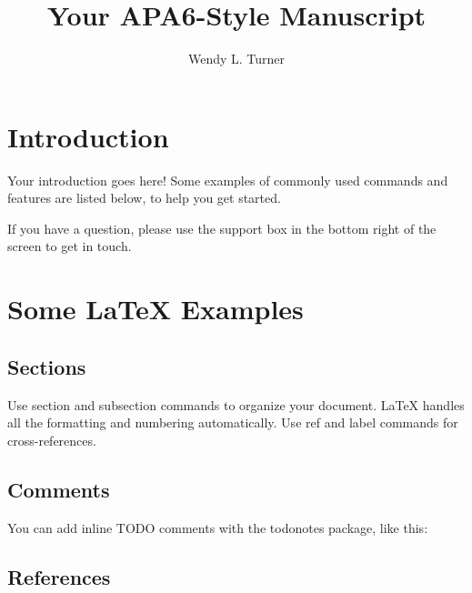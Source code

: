 \documentclass[letter,man,noextraspace,natbib]{apa6}
\title{Your APA6-Style Manuscript}
\author{Wendy L. Turner}
\affiliation{Abilene Christian University}
\begin{document}
\maketitle

\section{Introduction}

Your introduction goes here! Some examples of commonly used commands and features are listed below, to help you get started.

If you have a question, please use the support box in the bottom right of the screen to get in touch. 

\section{Some \LaTeX{} Examples}
\label{sec:examples}

\subsection{Sections}

Use section and subsection commands to organize your document. \LaTeX{} handles all the formatting and numbering automatically. Use ref and label commands for cross-references.

\subsection{Comments}

You can add inline TODO comments with the todonotes package, like this:

\subsection{References}
\end{document}
